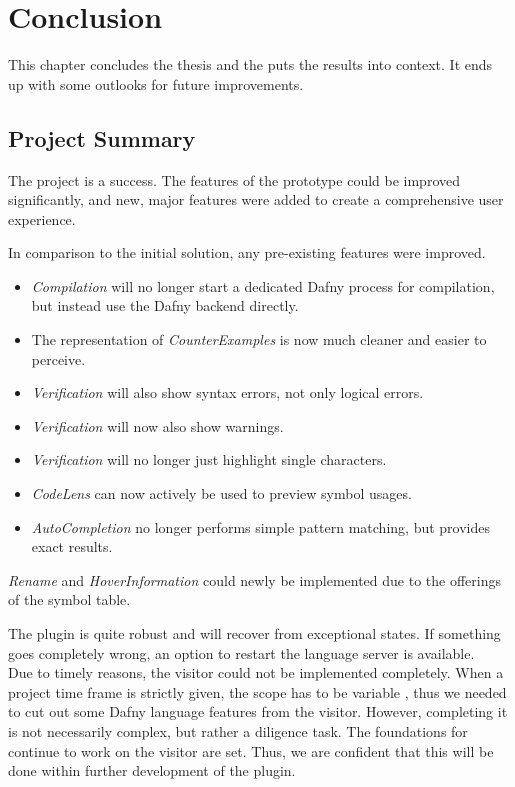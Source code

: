 \section{Conclusion}
\label{section:conclusion}
This chapter concludes the thesis and the puts the results into context.
It ends up with some outlooks for future improvements.

\subsection{Project Summary}
The project is a success.
The features of the prototype could be improved significantly, and new, major features were added to create a comprehensive user experience.

In comparison to the initial solution, any pre-existing features were improved.
\begin{itemize}
 \item \textit{Compilation} will no longer start a dedicated Dafny process for compilation, but instead use the Dafny backend directly.
 \item The representation of \textit{CounterExamples} is now much cleaner and easier to perceive.
 \item \textit{Verification} will also show syntax errors, not only logical errors.
 \item \textit{Verification} will now also show warnings.
 \item \textit{Verification} will no longer just highlight single characters.
 \item \textit{CodeLens} can now actively be used to preview symbol usages.
 \item \textit{AutoCompletion} no longer performs simple pattern matching, but provides exact results.
\end{itemize}
\textit{Rename} and \textit{HoverInformation} could newly be implemented due to the offerings of the symbol table.

The plugin is quite robust and will recover from exceptional states.
If something goes completely wrong, an option to restart the language server is available.\\

Due to timely reasons, the visitor could not be implemented completely.
When a project time frame is strictly given, the scope has to be variable \cite{keller},
thus we needed to cut out some Dafny language features from the visitor.
However, completing it is not necessarily complex, but rather a diligence task.
The foundations for continue to work on the visitor are set.
Thus, we are confident that this will be done within further development of the plugin.\\

